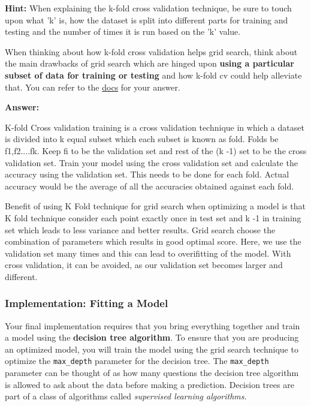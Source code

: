 \documentclass[11pt]{article}
\begin{document}
\textbf{Hint:} When explaining the k-fold cross validation technique, be
sure to touch upon what 'k' is, how the dataset is split into different
parts for training and testing and the number of times it is run based
on the 'k' value.

When thinking about how k-fold cross validation helps grid search, think
about the main drawbacks of grid search which are hinged upon
\textbf{using a particular subset of data for training or testing} and
how k-fold cv could help alleviate that. You can refer to the
\href{http://scikit-learn.org/stable/modules/cross_validation.html\#cross-validation}{docs}
for your answer.

    \textbf{Answer: }

K-fold Cross validation training is a cross validation technique in
which a dataset is divided into k equal subset which each subset is
known as fold. Folds be f1,f2....fk. Keep fi to be the validation set
and rest of the (k -1) set to be the cross validation set. Train your
model using the cross validation set and calculate the accuracy using
the validation set. This needs to be done for each fold. Actual accuracy
would be the average of all the accuracies obtained against each fold.

Benefit of using K Fold technique for grid search when optimizing a
model is that K fold technique consider each point exactly once in test
set and k -1 in training set which leads to less variance and better
results. Grid search choose the combination of parameters which results
in good optimal score. Here, we use the validation set many times and
this can lead to overifitting of the model. With cross validation, it
can be avoided, as our validation set becomes larger and different.

    \subsubsection{Implementation: Fitting a
Model}\label{implementation-fitting-a-model}

Your final implementation requires that you bring everything together
and train a model using the \textbf{decision tree algorithm}. To ensure
that you are producing an optimized model, you will train the model
using the grid search technique to optimize the
\texttt{\textquotesingle{}max\_depth\textquotesingle{}} parameter for
the decision tree. The
\texttt{\textquotesingle{}max\_depth\textquotesingle{}} parameter can be
thought of as how many questions the decision tree algorithm is allowed
to ask about the data before making a prediction. Decision trees are
part of a class of algorithms called \emph{supervised learning
algorithms}.
\end{document}
